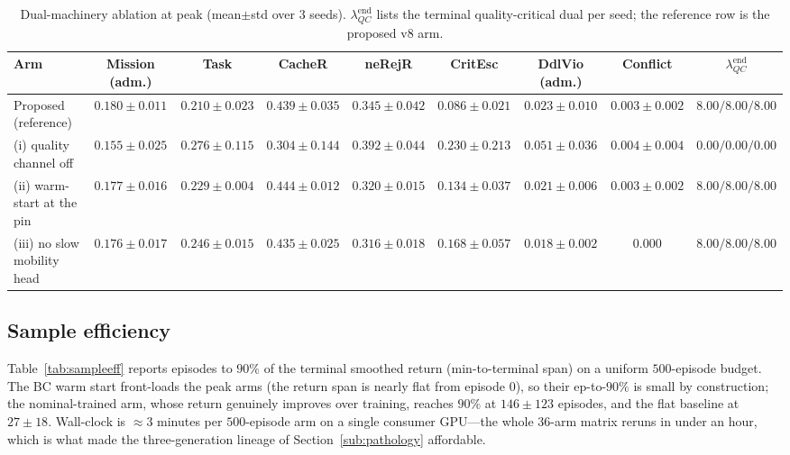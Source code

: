 \begin{table}[t]
\centering
\caption{Dual-machinery ablation at peak (mean$\pm$std over $3$ seeds).
$\lambda_{QC}^{\mathrm{end}}$ lists the terminal quality-critical dual per
seed; the reference row is the proposed v8 arm.}
\label{tab:ablation}
\scriptsize
\setlength{\tabcolsep}{3pt}
\begin{tabular}{@{}lcccccccc@{}}
\toprule
Arm & Mission (adm.) & Task & CacheR & neRejR & CritEsc & DdlVio (adm.) & Conflict & $\lambda_{QC}^{\mathrm{end}}$ \\
\midrule
Proposed (reference) & $0.180\pm0.011$ & $0.210\pm0.023$ & $0.439\pm0.035$ & $0.345\pm0.042$ & $0.086\pm0.021$ & $0.023\pm0.010$ & $0.003\pm0.002$ & $8.00/8.00/8.00$ \\
\;(i) quality channel off & $0.155\pm0.025$ & $0.276\pm0.115$ & $0.304\pm0.144$ & $0.392\pm0.044$ & $0.230\pm0.213$ & $0.051\pm0.036$ & $0.004\pm0.004$ & $0.00/0.00/0.00$ \\
\;(ii) warm-start at the pin & $0.177\pm0.016$ & $0.229\pm0.004$ & $0.444\pm0.012$ & $0.320\pm0.015$ & $0.134\pm0.037$ & $0.021\pm0.006$ & $0.003\pm0.002$ & $8.00/8.00/8.00$ \\
\;(iii) no slow mobility head & $0.176\pm0.017$ & $0.246\pm0.015$ & $0.435\pm0.025$ & $0.316\pm0.018$ & $0.168\pm0.057$ & $0.018\pm0.002$ & $0.000$ & $8.00/8.00/8.00$ \\
\bottomrule
\end{tabular}
\end{table}

\subsection{Sample efficiency}\label{sub:sampleeff}
Table~\ref{tab:sampleeff} reports episodes to $90\%$ of the terminal
smoothed return (min-to-terminal span) on a uniform $500$-episode budget.
The BC warm start front-loads the peak arms (the return span is nearly
flat from episode $0$), so their ep-to-$90\%$ is small by construction; the
nominal-trained arm, whose return genuinely improves over training,
reaches $90\%$ at $146\pm123$ episodes, and the flat baseline at
$27\pm18$. Wall-clock is $\approx\!3$ minutes per $500$-episode arm on a
single consumer GPU---the whole $36$-arm matrix reruns in under an hour,
which is what made the three-generation lineage of
Section~\ref{sub:pathology} affordable.

